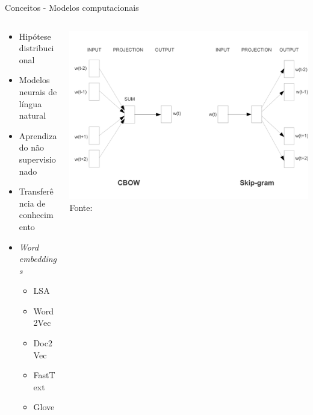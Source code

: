 \begin{frame}{Conceitos - Modelos computacionais}
\selectFont
\begin{columns}
	\begin{column}{0.60\textwidth}
		\begin{tcolorbox}[title=Modelo de representação distribuída,height=7cm,valign=center]\selectFont
			\begin{itemize}
				\item Hipótese distribucional
				\item Modelos neurais de língua natural \cite{Bengio2003}
				\item Aprendizado não supervisionado
				\item Transferência de conhecimento
				\item {\it Word embeddings} 
				\begin{itemize}\selectFont
					\item LSA
					\item Word2Vec
					\item Doc2Vec
					\item FastText
					\item Glove
				\end{itemize}
			\end{itemize}
		\end{tcolorbox}		
	\end{column}
	\begin{column}{0.40\textwidth}
		\begin{tcolorbox}[title=Modelo Word2Vec,height=7cm,valign=center]\selectFont
			\includegraphics[trim=350 20 0 20,clip,width=.95\textwidth]{images/efficient-models.pdf}
			Fonte: 
		\end{tcolorbox}		
	\end{column}
\end{columns}
\end{frame}


